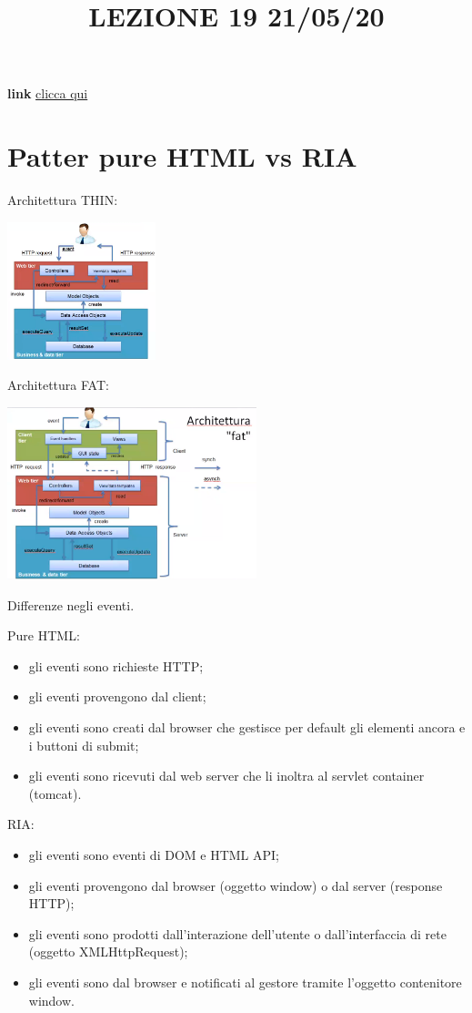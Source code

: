 \title{LEZIONE 19 21/05/20}
\textbf{link} \href{https://web.microsoftstream.com/video/9329ad3d-c8a8-48ab-b415-668ff6193e36?list=user&userId=cfe0965d-9a7c-40e2-be6e-f078296a1914}{clicca qui}
\section{Patter pure HTML vs RIA}
Architettura THIN:
\begin{center}
    \includegraphics[height=4cm]{../lezione19/img1.PNG}
\end{center}
Architettura FAT:
\begin{center}
    \includegraphics[height=5cm]{../lezione19/img2.PNG}
\end{center} 
Differenze negli eventi.\newline
\begin{multicols}{2}
Pure HTML:
\begin{itemize}
    \item gli eventi sono richieste HTTP;
    \item gli eventi provengono dal client;
    \item gli eventi sono creati dal browser che gestisce per default gli elementi ancora e i buttoni di submit;
    \item gli eventi sono ricevuti dal web server che li inoltra al servlet container (tomcat).
\end{itemize}
\vfill\null
\columnbreak
RIA:
\begin{itemize}
    \item gli eventi sono eventi di DOM e HTML API;
    \item gli eventi provengono dal browser (oggetto window) o dal server (response HTTP);
    \item gli eventi sono prodotti dall'interazione dell'utente o dall'interfaccia di rete (oggetto XMLHttpRequest);
    \item gli eventi sono dal browser e notificati al gestore tramite l'oggetto contenitore window.
\end{itemize}
\end{multicols}
